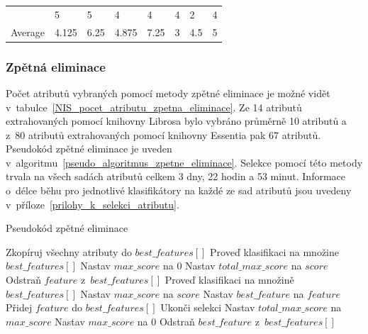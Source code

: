 \begin{table}[H]
{\begin{tabular}{llllllll}
    \rowcolor[HTML]{EFEFEF} 
    \multicolumn{1}{l|}{\cellcolor[HTML]{EFEFEF}XGBClassifier}          & 5       & 5                             & 4       & 4                             & 4       & 2                             & 4                         \\
    \multicolumn{1}{l|}{Average}                                        & 4.125   & 6.25                          & 4.875   & 7.25                          & 3       & 4.5                           & 5                        
    \end{tabular}}
\end{table}

\subsubsection*{Zpětná eliminace}
\label{NIS_zpetna_eliminace}
Počet atributů vybraných pomocí metody zpětné eliminace je možné vidět v~tabulce~\ref{NIS_pocet_atributu_zpetna_eliminace}. Ze 14 atributů extrahovaných pomocí knihovny Librosa bylo vybráno průměrně 10 atributů a z~80 atributů extrahovaných pomocí knihovny Essentia pak 67 atributů. Pseudokód zpětné eliminace je uveden v~algoritmu~\ref{pseudo_algoritmus_zpetne_eliminace}. Selekce pomocí této metody trvala na všech sadách atributů celkem 3 dny, 22 hodin a 53 minut. Informace o~délce běhu pro jednotlivé klasifikátory na každé ze sad atributů jsou uvedeny v~příloze~\ref{prilohy_k_selekci_atributu}.

\begin{algorithm}
    \caption{Pseudokód zpětné eliminace}
    \label{pseudo_algoritmus_zpetne_eliminace}
    \begin{algorithmic}[1]
        \State Zkopíruj všechny atributy do $best\_features[]$
        \State Proveď klasifikaci na množine $best\_features[]$
        \State Nastav $max\_score$ na $0$
        \State Nastav $total\_max\_score$ na $score$
                \State Odstraň $feature$ z~$best\_features[]$
                \State Proveď klasifikaci na množině $best\_features[]$
                    \State Nastav $max\_score$ na $score$
                    \State Nastav $best\_feature$ na $feature$
                \EndIf
                \State Přidej $feature$ do $best\_features[]$
            \EndFor
                \State Ukonči selekci
            \EndIf
            \State Nastav $total\_max\_score$ na $max\_score$
            \State Nastav $max\_score$ na $0$
            \State Odstraň $best\_feature$ z~$best\_features[]$
        \EndWhile
    \end{algorithmic}
\end{algorithm}

